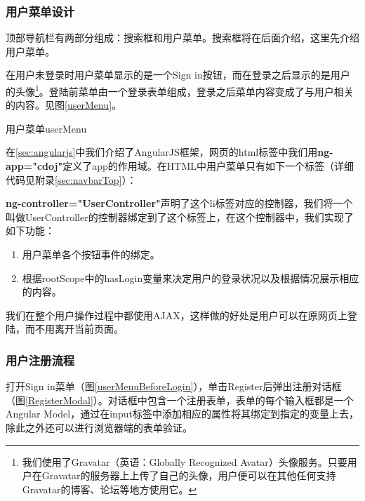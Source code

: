 \subsubsection{用户菜单设计}
顶部导航栏有两部分组成：搜索框和用户菜单。搜索框将在后面介绍，这里先介绍用户菜单。

在用户未登录时用户菜单显示的是一个Sign in按钮，而在登录之后显示的是用户的头像\footnote{我们使用了Gravatar（英语：Globally Recognized Avatar）头像服务。只要用户在Gravatar的服务器上上传了自己的头像，用户便可以在其他任何支持Gravatar的博客、论坛等地方使用它。}。登陆前菜单由一个登录表单组成，登录之后菜单内容变成了与用户相关的内容。见图\ref{userMenu}。

\begin{pics}[htbp]{用户菜单}{userMenu}
\end{pics}

在\ref{sec:angularjs}中我们介绍了AngularJS框架，网页的html标签中我们用\textbf{ng-app="cdoj"}定义了app的作用域。在HTML中用户菜单只有如下一个标签（详细代码见附录\ref{sec:navbarTop}）：



\textbf{ng-controller="UserController"}声明了这个li标签对应的控制器，我们将一个叫做UserController的控制器绑定到了这个标签上，在这个控制器中，我们实现了如下功能：
\begin{enumerate}
	\item 用户菜单各个按钮事件的绑定。
	\item 根据rootScope中的hasLogin变量来决定用户的登录状况以及根据情况展示相应的内容。
\end{enumerate}

我们在整个用户操作过程中都使用AJAX，这样做的好处是用户可以在原网页上登陆，而不用离开当前页面。

\subsubsection{用户注册流程}
打开Sign in菜单（图\ref{userMenuBeforeLogin}），单击Register后弹出注册对话框（图\ref{RegisterModal}）。对话框中包含一个注册表单，表单的每个输入框都是一个Angular Model，通过在input标签中添加相应的属性将其绑定到指定的变量上去，除此之外还可以进行浏览器端的表单验证。




